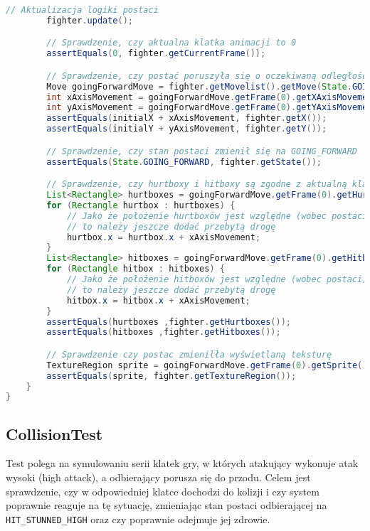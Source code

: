 \begin{lstlisting}[language=Java,style=JavaStyle,label=list:FighterTest,caption=Test metody \texttt{update} z klasy \texttt{Fighter},
                   basicstyle=\footnotesize\ttfamily]
        // Aktualizacja logiki postaci
        fighter.update();

        // Sprawdzenie, czy aktualna klatka animacji to 0
        assertEquals(0, fighter.getCurrentFrame());

        // Sprawdzenie, czy postać poruszyła się o oczekiwaną odległość
        Move goingForwardMove = fighter.getMovelist().getMove(State.GOING_FORWARD.getId());
        int xAxisMovement = goingForwardMove.getFrame(0).getXAxisMovement();
        int yAxisMovement = goingForwardMove.getFrame(0).getYAxisMovement();
        assertEquals(initialX + xAxisMovement, fighter.getX());
        assertEquals(initialY + yAxisMovement, fighter.getY());

        // Sprawdzenie, czy stan postaci zmienił się na GOING_FORWARD
        assertEquals(State.GOING_FORWARD, fighter.getState());

        // Sprawdzenie, czy hurtboxy i hitboxy są zgodne z aktualną klatką ruchu
        List<Rectangle> hurtboxes = goingForwardMove.getFrame(0).getHurtboxes();
        for (Rectangle hurtbox : hurtboxes) {
            // Jako że położenie hurtboxów jest względne (wobec postaci)
            // to należy jeszcze dodać przebytą drogę
            hurtbox.x = hurtbox.x + xAxisMovement;
        }
        List<Rectangle> hitboxes = goingForwardMove.getFrame(0).getHitboxes();
        for (Rectangle hitbox : hitboxes) {
            // Jako że położenie hitboxów jest względne (wobec postaci)
            // to należy jeszcze dodać przebytą drogę
            hitbox.x = hitbox.x + xAxisMovement;
        }
        assertEquals(hurtboxes ,fighter.getHurtboxes());
        assertEquals(hitboxes ,fighter.getHitboxes());

        // Sprawdzenie czy postac zmienilła wyświetlaną teksturę
        TextureRegion sprite = goingForwardMove.getFrame(0).getSprite();
        assertEquals(sprite, fighter.getTextureRegion());
    }
}
\end{lstlisting}

\subsection{CollisionTest}
Test polega na symulowaniu serii klatek gry, w których atakujący wykonuje atak wysoki (high attack), a odbierający porusza się do przodu. Celem jest sprawdzenie, czy w odpowiedniej klatce dochodzi do kolizji i czy system poprawnie reaguje na tę sytuację, zmieniając stan postaci odbierającej na \texttt{HIT\_STUNNED\_HIGH} oraz czy poprawnie odejmuje jej zdrowie.

